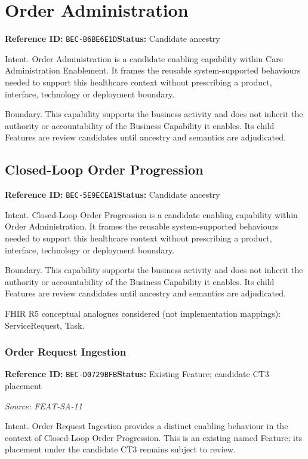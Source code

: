 \documentclass[11pt,a4paper,openany]{book}
\begin{document}
\section{Order Administration}\label{cap:bec-b6be6e1d}
\noindent\textbf{Reference ID:} \texttt{BEC-B6BE6E1D}\quad \textbf{Status:} Candidate ancestry\par
Intent. Order Administration is a candidate enabling capability within Care Administration Enablement. It frames the reusable system-supported behaviours needed to support this healthcare context without prescribing a product, interface, technology or deployment boundary.

Boundary. This capability supports the business activity and does not inherit the authority or accountability of the Business Capability it enables. Its child Features are review candidates until ancestry and semantics are adjudicated.

\subsection{Closed-Loop Order Progression}\label{cap:bec-5e9ecea1}
\noindent\textbf{Reference ID:} \texttt{BEC-5E9ECEA1}\quad \textbf{Status:} Candidate ancestry\par
Intent. Closed-Loop Order Progression is a candidate enabling capability within Order Administration. It frames the reusable system-supported behaviours needed to support this healthcare context without prescribing a product, interface, technology or deployment boundary.

Boundary. This capability supports the business activity and does not inherit the authority or accountability of the Business Capability it enables. Its child Features are review candidates until ancestry and semantics are adjudicated.

FHIR R5 conceptual analogues considered (not implementation mappings): ServiceRequest, Task.

\subsubsection{Order Request Ingestion}\label{cap:bec-d0729bfb}
\noindent\textbf{Reference ID:} \texttt{BEC-D0729BFB}\quad \textbf{Status:} Existing Feature; candidate CT3 placement\par
\noindent\textit{Source: FEAT-SA-11}\par
Intent. Order Request Ingestion provides a distinct enabling behaviour in the context of Closed-Loop Order Progression. This is an existing named Feature; its placement under the candidate CT3 remains subject to review.
\end{document}
